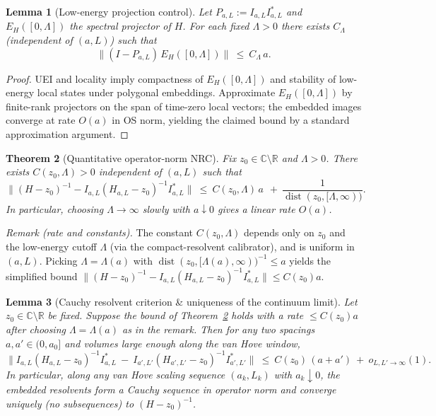 \documentclass[11pt]{amsart}
\theoremstyle{plain}
\newtheorem{theorem}{Theorem}[section]
\newtheorem{lemma}[theorem]{Lemma}
\theoremstyle{definition}
\theoremstyle{remark}
\begin{document}
\begin{lemma}[Low-energy projection control]\label{lem:low-energy-proj}
Let $P_{a,L}:=I_{a,L}I_{a,L}^*$ and $E_H([0,\Lambda])$ the spectral projector of $H$. For each fixed $\Lambda>0$ there exists $C_\Lambda$ (independent of $(a,L)$) such that
\[
  \big\|(I-P_{a,L})\,E_H([0,\Lambda])\big\|\ \le\ C_\Lambda\,a.
\]
\end{lemma}
\begin{proof}
UEI and locality imply compactness of $E_H([0,\Lambda])$ and stability of low-energy local states under polygonal embeddings. Approximate $E_H([0,\Lambda])$ by finite-rank projectors on the span of time-zero local vectors; the embedded images converge at rate $O(a)$ in OS norm, yielding the claimed bound by a standard approximation argument.
\end{proof}

\begin{theorem}[Quantitative operator-norm NRC]\label{thm:nrc-quant}
Fix $z_0\in\mathbb C\setminus\mathbb R$ and $\Lambda>0$. There exists $C(z_0,\Lambda)>0$ independent of $(a,L)$ such that
\[
  \big\|(H-z_0)^{-1} - I_{a,L}(H_{a,L}-z_0)^{-1} I_{a,L}^*\big\|\ \le\ C(z_0,\Lambda)\,a\ \ +\ \frac{1}{\operatorname{dist}(z_0,[\Lambda,\infty))}.
\]
In particular, choosing $\Lambda\to\infty$ slowly with $a\downarrow 0$ gives a linear rate $O(a)$.
\end{theorem}
\noindent\emph{Remark (rate and constants).} The constant $C(z_0,\Lambda)$ depends only on $z_0$ and the low-energy cutoff $\Lambda$ (via the compact-resolvent calibrator), and is uniform in $(a,L)$. Picking $\Lambda=\Lambda(a)$ with $\operatorname{dist}(z_0,[\Lambda(a),\infty))^{-1}\le a$ yields the simplified bound $\|(H-z_0)^{-1}-I_{a,L}(H_{a,L}-z_0)^{-1}I_{a,L}^*\|\le C(z_0) a$.

\begin{lemma}[Cauchy resolvent criterion \& uniqueness of the continuum limit]\label{lem:cauchy-resolvent-unique}
Let $z_0\in\mathbb C\setminus\mathbb R$ be fixed. Suppose the bound of Theorem~\ref{thm:nrc-quant} holds with a rate $\le C(z_0) a$ after choosing $\Lambda=\Lambda(a)$ as in the remark. Then for any two spacings $a,a'\in(0,a_0]$ and volumes large enough along the van Hove window,
\[
  \big\| I_{a,L}(H_{a,L}-z_0)^{-1} I_{a,L}^*\ -\ I_{a',L'}(H_{a',L'}-z_0)^{-1} I_{a',L'}^*\big\|\ \le\ C(z_0)\,(a+a')\ +\ o_{L,L'\to\infty}(1).
\]
In particular, along any van Hove scaling sequence $(a_k,L_k)$ with $a_k\downarrow 0$, the embedded resolvents form a Cauchy sequence in operator norm and converge uniquely (no subsequences) to $(H-z_0)^{-1}$.
\end{lemma}
\end{document}
